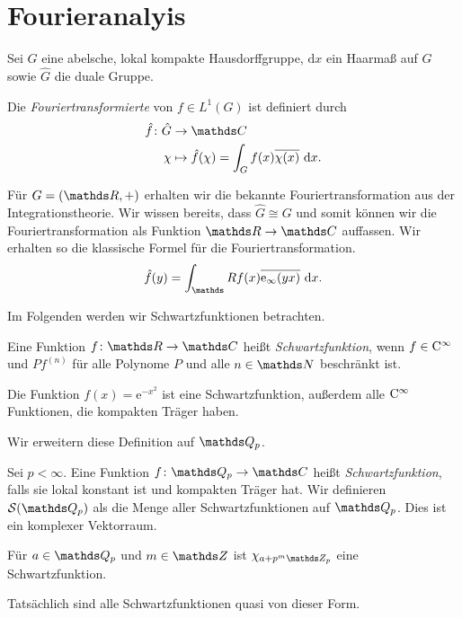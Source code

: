 \chapter{Fourieranalyis}
Sei $G$ eine abelsche, lokal kompakte Hausdorffgruppe, $\mathrm{d}x$ ein Haarmaß auf $G$
sowie $\hat{G}$ die duale Gruppe.
\begin{defi}
Die \emph{Fouriertransformierte} von $f \in \mathit{L}^1(G)$ ist definiert durch
\begin{align*}
\hat{f}\colon \hat{G} &\to \C\\
\chi &\mapsto \hat{f}(\chi)=\int_G f(x)\overline{\chi(x)}~\mathrm{d}x.
\end{align*}
\end{defi}

\begin{bsp}
Für $G=(\R,+)$ erhalten wir die bekannte Fouriertransformation aus der Integrationstheorie.
Wir wissen bereits, dass $\hat{G} \cong G$ und somit können wir die Fouriertransformation als Funktion $\R \to \C$ auffassen.
Wir erhalten so die klassische Formel für die Fouriertransformation.
\begin{align*}
\hat{f}(y)=\int_\R f(x)\overline{\mathrm{e}_{\infty}(yx)}~\mathrm{d}x.
\end{align*}
\end{bsp}

Im Folgenden werden wir Schwartzfunktionen betrachten.
\begin{defi}
Eine Funktion $f\colon \R \to \C$ heißt \emph{Schwartzfunktion}, wenn $f \in \mathrm{C}^\infty$ und $Pf^{(n)}$ für alle Polynome $P$ und alle $n \in \N$ beschränkt ist.
\end{defi}
\begin{bsp}
Die Funktion $f(x)=\mathrm{e}^{-x^2}$ ist eine Schwartzfunktion, außerdem alle $\mathrm{C}^\infty$ Funktionen, die kompakten Träger haben.
\end{bsp}
Wir erweitern diese Definition auf $\Q_p$.
\begin{defi}
Sei $p<\infty$. Eine Funktion $f \colon \Q_p \to \C$ heißt \emph{Schwartzfunktion}, falls sie lokal konstant ist und kompakten Träger hat.
Wir definieren $\Sq$ als die Menge aller Schwartzfunktionen auf $\Q_p$.
Dies ist ein komplexer Vektorraum.
\end{defi}
\begin{bsp}
Für $a \in \Q_p$ und $m\in \Z$ ist $\chi_{a+p^m\Z_p}$ eine Schwartzfunktion.
\end{bsp}

Tatsächlich sind alle Schwartzfunktionen quasi von dieser Form.

